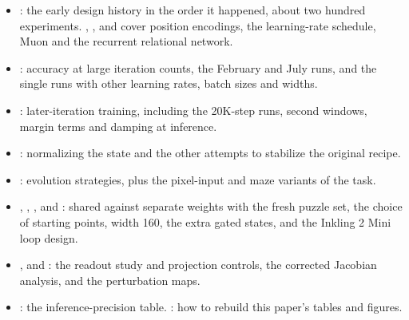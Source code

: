 \begin{itemize}
\raggedright
\item {}: the early design history in the order it happened, about two hundred experiments. , ,  and  cover position encodings, the learning-rate schedule, Muon and the recurrent relational network.
\item {}: accuracy at large iteration counts, the February and July runs, and the single runs with other learning rates, batch sizes and widths.
\item {}: later-iteration training, including the 20K-step runs, second windows, margin terms and damping at inference.
\item {}: normalizing the state and the other attempts to stabilize the original recipe.
\item {}: evolution strategies, plus the pixel-input and maze variants of the task.
\item {}, , ,  and : shared against separate weights with the fresh puzzle set, the choice of starting points, width 160, the extra gated states, and the Inkling 2 Mini loop design.
\item {},  and : the readout study and projection controls, the corrected Jacobian analysis, and the perturbation maps.
\item {}: the inference-precision table. : how to rebuild this paper's tables and figures.
\end{itemize}
